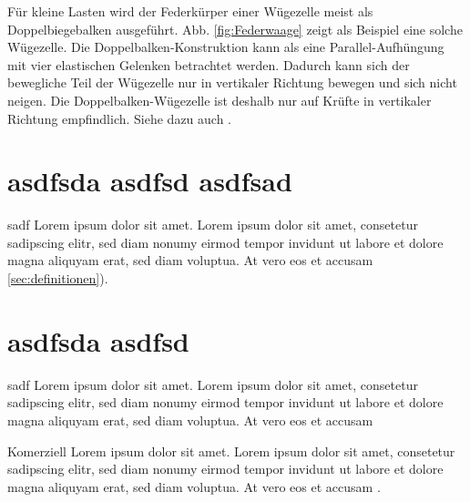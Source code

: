 Für 
kleine Lasten wird der Federkürper einer Wügezelle meist als Doppelbiegebalken ausgeführt. Abb. \ref{fig:Federwaage} zeigt als Beispiel eine solche Wügezelle. Die Doppel\-balken-Konstruktion kann als eine Parallel-Aufhüngung mit vier elastischen Gelenken betrachtet werden. Dadurch kann sich der bewegliche Teil der Wügezelle nur in vertikaler Richtung bewegen und sich nicht neigen. Die Doppelbalken-Wügezelle ist deshalb nur auf Krüfte in vertikaler Richtung empfindlich. Siehe dazu auch \cite{patentYamato}.

\section{asdfsda asdfsd asdfsad}
sadf 
Lorem ipsum dolor sit amet. Lorem ipsum dolor sit amet, consetetur sadipscing elitr, sed diam nonumy eirmod tempor invidunt ut labore et dolore magna aliquyam erat, sed diam voluptua. At vero eos et accusam  \ref{sec:definitionen}).

\section{asdfsda asdfsd}
sadf 
Lorem ipsum dolor sit amet. Lorem ipsum dolor sit amet, consetetur sadipscing elitr, sed diam nonumy eirmod tempor invidunt ut labore et dolore magna aliquyam erat, sed diam voluptua. At vero eos et accusam  

Komerziell 
Lorem ipsum dolor sit amet. Lorem ipsum dolor sit amet, consetetur sadipscing elitr, sed diam nonumy eirmod tempor invidunt ut labore et dolore magna aliquyam erat, sed diam voluptua. At vero eos et accusam  \cite{dynamic}.
 